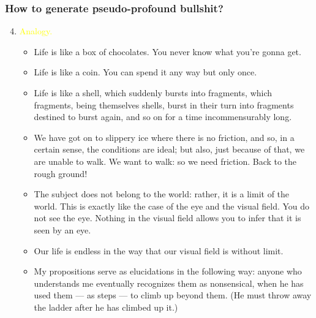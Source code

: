 \documentclass[UTF8,11pt,colorlinks,compress,openany]{beamer}%
\begin{document}
\begin{frame}\frametitle{How to generate pseudo-profound bullshit?}\vspace{-30pt}
	\begin{enumerate}\setcounter{enumi}{3}
		\item \textcolor{yellow}{Analogy.}
		\begin{itemize}
			\item Life is like a box of chocolates. You never know what you're gonna get.
			\item Life is like a coin. You can spend it any way but only once.
			\item Life is like a shell, which suddenly bursts into fragments, which fragments, being themselves shells, burst in their turn into fragments destined to burst again, and so on for a time incommensurably long.
			\item We have got on to slippery ice where there is no friction, and so, in a certain sense, the conditions are ideal; but also, just because of that, we are unable to walk. We want to walk: so we need friction. Back to the rough ground!
			\item The subject does not belong to the world: rather, it is a limit of the world. This is exactly like the case of the eye
			and the visual field. You do not see the eye. Nothing in the visual field allows you to infer that it is seen by an eye.
			\item Our life is endless in the way that our visual field is without limit.
			\item My propositions serve as elucidations in the following
			way: anyone who understands me eventually recognizes
			them as nonsensical, when he has used them --- as
			steps --- to climb up beyond them. (He must throw away the ladder after he has climbed up it.)
		\end{itemize}
	\end{enumerate}
	\begin{center}\vspace{-2.9cm}
	\end{center}
\end{frame}
\end{document}
